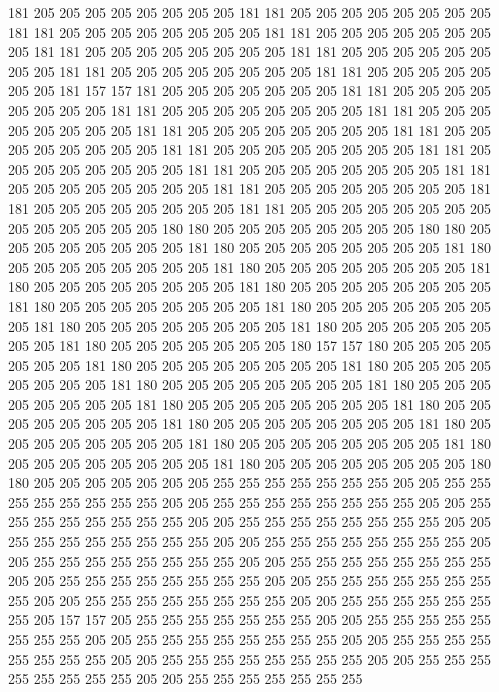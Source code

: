 181 205 205 205 205 205 205 205 205 181 181 205 205 205 205 205 205 205 205 181
181 205 205 205 205 205 205 205 205 181 181 205 205 205 205 205 205 205 205 181
181 205 205 205 205 205 205 205 205 181 181 205 205 205 205 205 205 205 205 181
181 205 205 205 205 205 205 205 205 181 181 205 205 205 205 205 205 205 181 157
157 181 205 205 205 205 205 205 205 181 181 205 205 205 205 205 205 205 205 181
181 205 205 205 205 205 205 205 205 181 181 205 205 205 205 205 205 205 205 181
181 205 205 205 205 205 205 205 205 181 181 205 205 205 205 205 205 205 205 181
181 205 205 205 205 205 205 205 205 181 181 205 205 205 205 205 205 205 205 181
181 205 205 205 205 205 205 205 205 181 181 205 205 205 205 205 205 205 205 181
181 205 205 205 205 205 205 205 205 181 181 205 205 205 205 205 205 205 205 181
181 205 205 205 205 205 205 205 205 205 205 205 205 205 205 180 180 205 205 205
205 205 205 205 205 180 180 205 205 205 205 205 205 205 205 181 180 205 205 205
205 205 205 205 205 181 180 205 205 205 205 205 205 205 205 181 180 205 205 205
205 205 205 205 205 181 180 205 205 205 205 205 205 205 205 181 180 205 205 205
205 205 205 205 205 181 180 205 205 205 205 205 205 205 205 181 180 205 205 205
205 205 205 205 205 181 180 205 205 205 205 205 205 205 205 181 180 205 205 205
205 205 205 205 205 181 180 205 205 205 205 205 205 205 180 157 157 180 205 205
205 205 205 205 205 181 180 205 205 205 205 205 205 205 205 181 180 205 205 205
205 205 205 205 205 181 180 205 205 205 205 205 205 205 205 181 180 205 205 205
205 205 205 205 205 181 180 205 205 205 205 205 205 205 205 181 180 205 205 205
205 205 205 205 205 181 180 205 205 205 205 205 205 205 205 181 180 205 205 205
205 205 205 205 205 181 180 205 205 205 205 205 205 205 205 181 180 205 205 205
205 205 205 205 205 181 180 205 205 205 205 205 205 205 205 180 180 205 205 205
205 205 205 205 255 255 255 255 255 255 255 205 205 255 255 255 255 255 255 255
255 205 205 255 255 255 255 255 255 255 255 205 205 255 255 255 255 255 255 255
255 205 205 255 255 255 255 255 255 255 255 205 205 255 255 255 255 255 255 255
255 205 205 255 255 255 255 255 255 255 255 205 205 255 255 255 255 255 255 255
255 205 205 255 255 255 255 255 255 255 255 205 205 255 255 255 255 255 255 255
255 205 205 255 255 255 255 255 255 255 255 205 205 255 255 255 255 255 255 255
255 205 205 255 255 255 255 255 255 255 205 157 157 205 255 255 255 255 255 255
255 205 205 255 255 255 255 255 255 255 255 205 205 255 255 255 255 255 255 255
255 205 205 255 255 255 255 255 255 255 255 205 205 255 255 255 255 255 255 255
255 205 205 255 255 255 255 255 255 255 255 205 205 255 255 255 255 255 255 255
